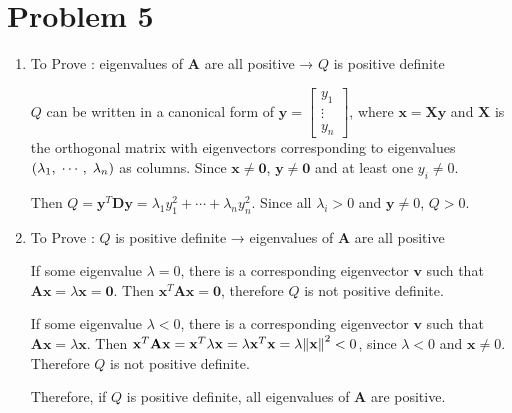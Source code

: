 \documentclass[10pt]{article}
\begin{document}
\section*{Problem 5}
\begin{enumerate}[leftmargin=*, label={(\alph*)}]
    \item To Prove : eigenvalues of $\mathbf{A}$ are all positive → $Q$ is positive definite
    
    $Q$ can be written in a canonical form of $\mathbf{y} = \begin{bmatrix}
        y_1 \\ \vdots \\ y_n
    \end{bmatrix}$, where $\mathbf{x} = \mathbf{Xy}$ and $\mathbf{X}$ is the orthogonal matrix with eigenvectors corresponding to eigenvalues $\qty(\lambda_1, \; \cdots, \; \lambda_n)$ as columns. 
    Since $\mathbf{x} \neq \mathbf{0}$, $\mathbf{y} \neq \mathbf{0}$ and at least one $y_i \neq 0$.

    Then $Q = \mathbf{y}^T\mathbf{Dy} = \lambda_1y_1^2 + \cdots + \lambda_ny_n^2$. 
    Since all $\lambda_i > 0$ and $\mathbf{y} \neq 0$, $Q > 0$.
    \item To Prove : $Q$ is positive definite → eigenvalues of $\mathbf{A}$ are all positive
    
    If some eigenvalue $\lambda = 0$, there is a corresponding eigenvector $\mathbf{v}$ such that $\mathbf{Ax} = \lambda\mathbf{x} = \mathbf{0}$.
    Then $\mathbf{x}^T\mathbf{Ax} = \mathbf{0}$, therefore $Q$ is not positive definite.

    If some eigenvalue $\lambda < 0$, there is a corresponding eigenvector $\mathbf{v}$ such that $\mathbf{Ax} = \lambda\mathbf{x}$.
    Then $\mathbf{x}^T\mathbf{Ax} = \mathbf{x}^T\lambda\mathbf{x} = \lambda\mathbf{x}^T\mathbf{x} = \lambda\norm{\mathbf{x}}^2 < 0$, since $\lambda < 0$ and $\mathbf{x} \neq 0$. Therefore $Q$ is not positive definite.

    Therefore, if $Q$ is positive definite, all eigenvalues of $\mathbf{A}$ are positive.
\end{enumerate}
\end{document}
